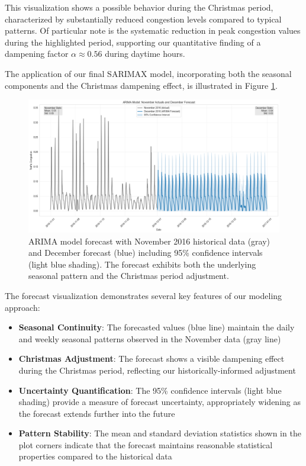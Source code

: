 \documentclass{article}
\begin{document}
This visualization shows a possible behavior during the Christmas period, characterized by substantially reduced congestion levels compared to typical patterns. Of particular note is the systematic reduction in peak congestion values during the highlighted period, supporting our quantitative finding of a dampening factor $\alpha \approx 0.56$ during daytime hours.

The application of our final SARIMAX model, incorporating both the seasonal components and the Christmas dampening effect, is illustrated in Figure \ref{fig:arima_forecast}.

\begin{figure}[htbp]
    \centering
    \includegraphics[width=\textwidth]{arima_forecast.png}
    \caption{ARIMA model forecast with November 2016 historical data (gray) and December forecast (blue) including 95\% confidence intervals (light blue shading). The forecast exhibits both the underlying seasonal pattern and the Christmas period adjustment.}
    \label{fig:arima_forecast}
\end{figure}

The forecast visualization demonstrates several key features of our modeling approach:

\begin{itemize}
    \item \textbf{Seasonal Continuity}: The forecasted values (blue line) maintain the daily and weekly seasonal patterns observed in the November data (gray line)
    
    \item \textbf{Christmas Adjustment}: The forecast shows a visible dampening effect during the Christmas period, reflecting our historically-informed adjustment
    
    \item \textbf{Uncertainty Quantification}: The 95\% confidence intervals (light blue shading) provide a measure of forecast uncertainty, appropriately widening as the forecast extends further into the future
    
    \item \textbf{Pattern Stability}: The mean and standard deviation statistics shown in the plot corners indicate that the forecast maintains reasonable statistical properties compared to the historical data
\end{itemize}
\end{document}
